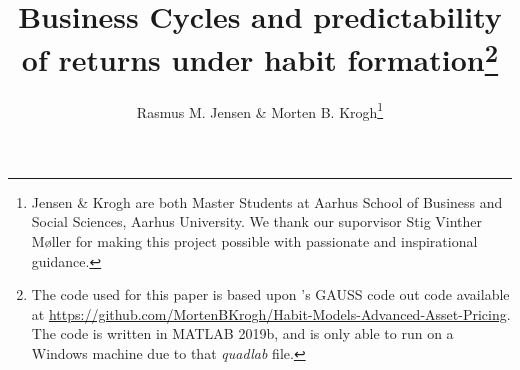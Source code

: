 

\usepackage{booktabs}



\onehalfspacing      %

\author{Rasmus M. Jensen \& Morten B. Krogh\thanks{\rm Jensen \& Krogh are both Master Students at Aarhus School of Business and Social Sciences, Aarhus University. We thank our suporvisor Stig Vinther Møller for making this project possible with passionate and inspirational guidance.}}

\title{\Large \bf Business Cycles and predictability of returns under habit formation\footnote{The code used for this paper is based upon \cite{Campbell1999}'s GAUSS code out code available at \url{https://github.com/MortenBKrogh/Habit-Models-Advanced-Asset-Pricing}. The code is written in MATLAB 2019b, and is only able to run on a Windows machine due to that \textit{quadlab} file.}}

\date{}              %


\maketitle
\thispagestyle{empty}



\clearpage







\clearpage

\begin{doublespacing}   %


\end{doublespacing}



\clearpage

\renewcommand{\enotesize}{\normalsize}


\appendix



\clearpage


